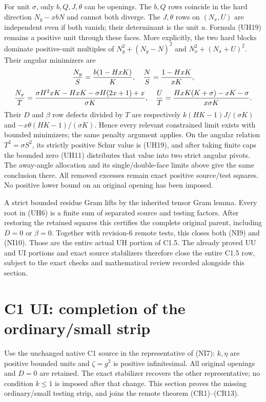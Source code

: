 For unit $\sigma$, only $b,Q,J,\theta$ can be openings.
The $b,Q$ rows coincide in the hard direction $N_y-xbN$ and cannot
both diverge. The $J,\theta$ rows on $(N_x,U)$ are independent even
if both vanish; their determinant is the unit $u$. Formula (UH19)
remains a positive unit through these faces. More explicitly, the
two hard blocks dominate positive-unit multiples of
$N_y^2+(N_y-N)^2$ and $N_x^2+(N_x+U)^2$. Their angular minimizers are
\[
 {N_y\over S}={b(1-HxK)\over K},\quad
 {N\over S}={1-HxK\over xK},
\]
\[
 {N_x\over T}={\sigma H^2xK-HxK-\sigma H(2x+1)+x\over\sigma K},
 \quad {U\over T}={HxK(K+\sigma)-xK-\sigma\over x\sigma K}.
\]
Their $D$ and $\beta$ row defects divided by $T$ are respectively
$k(HK-1)J/(\sigma K)$ and $-x\theta(HK-1)/(\sigma K)$.
Hence every relevant constrained limit exists with bounded
minimizers; the same penalty argument applies. On the angular
relation $T^2=\sigma S^2$, its strictly positive Schur value is
(UH19), and after taking finite caps the bounded zero (UH11)
distributes that value into two strict angular pivots. The away-angle
allocation and its single/double-face limits above give the same
conclusion there. All removed excesses remain exact positive
source/test squares. No positive lower bound on an original opening
has been imposed.

A strict bounded residue Gram lifts by the inherited tensor Gram
lemma. Every root in (UH6) is a finite sum of separated source and
testing factors. After restoring the retained squares this certifies
the complete original parent, including $D=0$ or $\beta=0$.
Together with revision-6 remote tests, this closes both (NI9) and
(NI10). Those are the entire actual UH portion of C1.5. The already
proved UU and UI portions and exact source stabilizers therefore close
the entire C1.5 row, subject to the exact checks and mathematical review
recorded alongside this section.


\section{\texorpdfstring{C1 UI: completion of the ordinary/small strip}{C1 UI: completion of the ordinary/small strip}}
\label{component:pa0b854a04f49}

\label{pa0b854a04f49:sec:r6-c1-ui}
Use the unchanged native C1 source in the representative of (NI7):
$k,\eta$ are positive bounded units and $\zeta=g^2$ is positive
infinitesimal. All original openings and $D=0$ are retained.
The exact stabilizer recovers the other representative; no condition
$k\le1$ is imposed after that change. This section proves the missing
ordinary/small testing strip, and joins the remote theorem (CR1)--(CR13).

